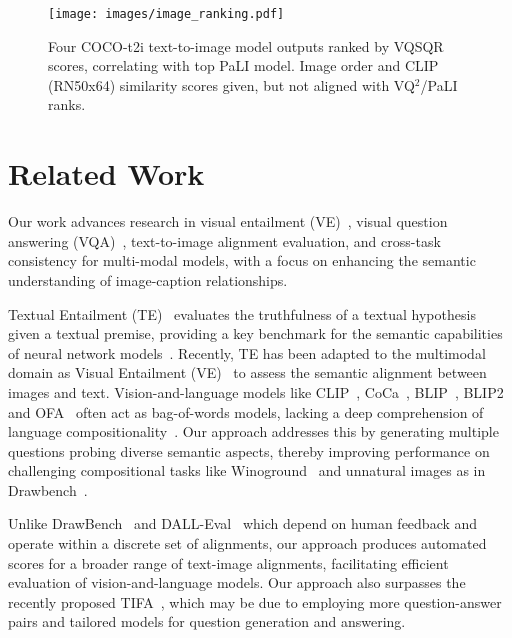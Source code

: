 \documentclass{article}
\newcommand{\VQSQR}[0]{VQ$^2$\xspace}
\begin{document}
\begin{figure}[!htbp]
    \centering
    \texttt{[image: images/image\_ranking.pdf]}
    \caption{Four COCO-t2i text-to-image model outputs ranked by VQSQR scores, correlating with top PaLI model. Image order and CLIP (RN50x64) similarity scores given, but not aligned with \VQSQR/PaLI ranks.}
    \label{fig:fig_image_gen_ranking}
\end{figure}  


\section{Related Work}
\label{sec:related}
Our work advances research in visual entailment (VE)~\citep{xie2019visual}, visual question answering (VQA)~\citep{antol2015vqa}, text-to-image alignment evaluation, and cross-task consistency for multi-modal models, with a focus on enhancing the semantic understanding of image-caption relationships.

Textual Entailment (TE)~\citep{dagan2010recognizing,SNLI} evaluates the truthfulness of a textual hypothesis given a textual premise, providing a key benchmark for the semantic capabilities of neural network models~\citep{BERT,T5,InstructGPT,chowdhery2022palm}. Recently, TE has been adapted to the multimodal domain as Visual Entailment (VE)~\citep{xie2019visual} to assess the semantic alignment between images and text. Vision-and-language models like CLIP~\citep{radford2021learning}, CoCa~\citep{yu2022coca}, BLIP~\citep{li2022blip}, BLIP2~\citep{li2023blip} and OFA~\citep{wang2022ofa} often act as bag-of-words models, lacking a deep comprehension of language compositionality~\citep{yuksekgonul2022and}. Our approach addresses this by generating multiple questions probing diverse semantic aspects, thereby improving performance on challenging compositional tasks like Winoground~\citep{thrush2022winoground} and unnatural images as in Drawbench~\citep{saharia2022photorealistic}.

Unlike DrawBench~\citep{saharia2022photorealistic} and DALL-Eval~\citep{cho2022dall} which depend on human feedback and operate within a discrete set of alignments, our approach produces automated scores for a broader range of text-image alignments, facilitating efficient evaluation of vision-and-language models. Our approach also surpasses the recently proposed TIFA~\citep{hu2023tifa}, which may be due to employing more question-answer pairs and tailored models for question generation and answering.
\end{document}
